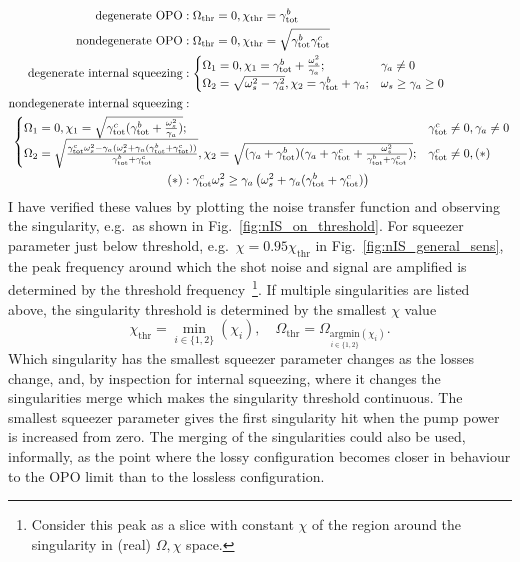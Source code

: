 \begin{align}\label{eq:singularity_threshold}
\text{degenerate OPO}&: \Omega_\text{thr}=0, \chi_\text{thr}=\gamma^b_\mathrm{tot}\\
\text{nondegenerate OPO}&: \Omega_\text{thr}=0, \chi_\text{thr}=\sqrt{\gamma^b_\mathrm{tot}\gamma^c_\text{tot}}\\
\text{degenerate internal squeezing}&:\begin{cases}
\Omega_1=0, \chi_1=\gamma^b_\mathrm{tot}+\frac{\omega_s^2}{\gamma_a};&\gamma_a\neq0\\
\Omega_2=\sqrt{\omega_s^2-\gamma_a^2}, \chi_2=\gamma^b_\mathrm{tot}+\gamma_a;&\omega_s\geq\gamma_a\geq0
\end{cases}\\
\text{nondegenerate internal squeezing}&:\\&\hspace{-5cm}\begin{cases}
\Omega_1=0, \chi_1=\sqrt{\gamma^c_\text{tot}(\gamma^b_\mathrm{tot}+\frac{\omega_s^2}{\gamma_a})};&\gamma^c_\text{tot}\neq0,\gamma_a\neq0\\
\Omega_2=\sqrt{\frac{\gamma^c_\text{tot}\omega_s^2-\gamma_a(\omega_s^2+\gamma_a(\gamma^b_\mathrm{tot}+\gamma^c_\text{tot}))}{\gamma^b_\mathrm{tot}+\gamma^c_\text{tot}}}, \chi_2=\sqrt{(\gamma_a+\gamma^b_\mathrm{tot})(\gamma_a+\gamma^c_\text{tot}+\frac{\omega_s^2}{\gamma^b_\mathrm{tot}+\gamma^c_\text{tot}})};&\gamma^c_\text{tot}\neq0,(*)
\end{cases}\\
(*)&:\gamma^c_\text{tot}\omega_s^2\geq\gamma_a\left(\omega_s^2+\gamma_a(\gamma^b_\mathrm{tot}+\gamma^c_\text{tot})\right)
\end{align}
\endgroup
I have verified these values by plotting the noise transfer function and observing the singularity, e.g.\ as shown in Fig.~\ref{fig:nIS_on_threshold}. For squeezer parameter just below threshold, e.g.\ $\chi=0.95\chi_\text{thr}$ in Fig.~\ref{fig:nIS_general_sens}, the peak frequency around which the shot noise and signal are amplified is determined by the threshold frequency~\footnote{Consider this peak as a slice with constant $\chi$ of the region around the singularity in (real) $\Omega,\chi$ space.}. If multiple singularities are listed above, the singularity threshold is determined by the smallest $\chi$ value $$\chi_\text{thr}=\min_{i\in\{1,2\}}(\chi_i),\quad\Omega_\text{thr}=\Omega_{\underset{i\in\{1,2\}}{\text{argmin}}(\chi_i)}.$$ Which singularity has the smallest squeezer parameter changes as the losses change, and, by inspection for internal squeezing, where it changes the singularities merge which makes the singularity threshold continuous. The smallest squeezer parameter gives the first singularity hit when the pump power is increased from zero. The merging of the singularities could also be used, informally, as the point where the lossy configuration becomes closer in behaviour to the OPO limit than to the lossless configuration.

